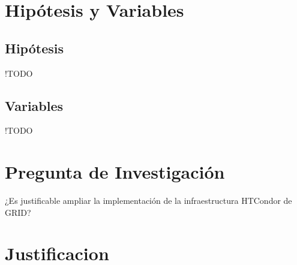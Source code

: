 
\chapter*{Hipótesis y Variables}
\section{Hipótesis}
!TODO 
\section{Variables}
!TODO

\chapter*{Pregunta de Investigación}
¿Es justificable ampliar la implementación de la infraestructura HTCondor de GRID?

\chapter*{Justificacion}

